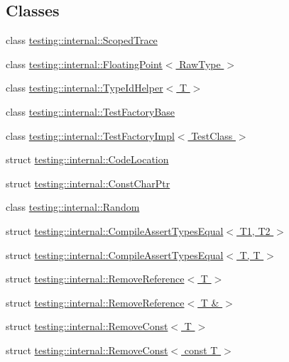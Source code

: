 \subsection*{Classes}
\begin{DoxyCompactItemize}
\item 
class \hyperlink{classtesting_1_1internal_1_1_scoped_trace}{testing\+::internal\+::\+Scoped\+Trace}
\item 
class \hyperlink{classtesting_1_1internal_1_1_floating_point}{testing\+::internal\+::\+Floating\+Point$<$ Raw\+Type $>$}
\item 
class \hyperlink{classtesting_1_1internal_1_1_type_id_helper}{testing\+::internal\+::\+Type\+Id\+Helper$<$ T $>$}
\item 
class \hyperlink{classtesting_1_1internal_1_1_test_factory_base}{testing\+::internal\+::\+Test\+Factory\+Base}
\item 
class \hyperlink{classtesting_1_1internal_1_1_test_factory_impl}{testing\+::internal\+::\+Test\+Factory\+Impl$<$ Test\+Class $>$}
\item 
struct \hyperlink{structtesting_1_1internal_1_1_code_location}{testing\+::internal\+::\+Code\+Location}
\item 
struct \hyperlink{structtesting_1_1internal_1_1_const_char_ptr}{testing\+::internal\+::\+Const\+Char\+Ptr}
\item 
class \hyperlink{classtesting_1_1internal_1_1_random}{testing\+::internal\+::\+Random}
\item 
struct \hyperlink{structtesting_1_1internal_1_1_compile_assert_types_equal}{testing\+::internal\+::\+Compile\+Assert\+Types\+Equal$<$ T1, T2 $>$}
\item 
struct \hyperlink{structtesting_1_1internal_1_1_compile_assert_types_equal_3_01_t_00_01_t_01_4}{testing\+::internal\+::\+Compile\+Assert\+Types\+Equal$<$ T, T $>$}
\item 
struct \hyperlink{structtesting_1_1internal_1_1_remove_reference}{testing\+::internal\+::\+Remove\+Reference$<$ T $>$}
\item 
struct \hyperlink{structtesting_1_1internal_1_1_remove_reference_3_01_t_01_6_01_4}{testing\+::internal\+::\+Remove\+Reference$<$ T \& $>$}
\item 
struct \hyperlink{structtesting_1_1internal_1_1_remove_const}{testing\+::internal\+::\+Remove\+Const$<$ T $>$}
\item 
struct \hyperlink{structtesting_1_1internal_1_1_remove_const_3_01const_01_t_01_4}{testing\+::internal\+::\+Remove\+Const$<$ const T $>$}
\item 

\end{DoxyCompactItemize}
